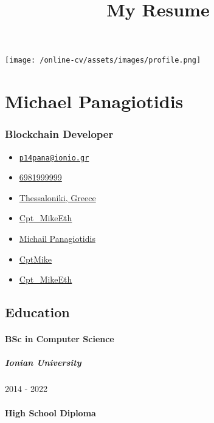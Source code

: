 \documentclass[english,]{article}
\title{My Resume}
\date{}
\providecommand{\tightlist}{%
  \setlength{\itemsep}{0pt}\setlength{\parskip}{0pt}}
\let\oldparagraph\paragraph
\renewcommand{\paragraph}[1]{\oldparagraph{#1}\mbox{}}
\let\oldsubparagraph\subparagraph
\renewcommand{\subparagraph}[1]{\oldsubparagraph{#1}\mbox{}}
\begin{document}
\maketitle

\texttt{[image: /online-cv/assets/images/profile.png]}

\hypertarget{michael-panagiotidis}{%
\section{Michael Panagiotidis}\label{michael-panagiotidis}}

\hypertarget{blockchain-developer}{%
\subsubsection{Blockchain Developer}\label{blockchain-developer}}

\begin{itemize}
\tightlist
\item
  \emph{} \href{mailto:p14pana@ionio.gr}{\nolinkurl{p14pana@ionio.gr}}
\item
  \emph{} \href{tel:6981999999}{6981999999}
\item
  \emph{} \href{}{Thessaloniki, Greece}
\item
  \emph{} \href{https://t.me/Cpt_MikeEth}{Cpt\_MikeEth}
\item
  \emph{} \href{https://linkedin.com/in/Michail\%20Panagiotidis}{Michail
  Panagiotidis}
\item
  \emph{} \href{http://github.com/CptMike}{CptMike}
\item
  \emph{} \href{https://twitter.com/Cpt_MikeEth}{Cpt\_MikeEth}
\end{itemize}

\hypertarget{education}{%
\subsection{Education}\label{education}}

\hypertarget{bsc-in-computer-science}{%
\paragraph{BSc in Computer Science}\label{bsc-in-computer-science}}

\hypertarget{ionian-university}{%
\subparagraph{Ionian University}\label{ionian-university}}

2014 - 2022

\hypertarget{high-school-diploma}{%
\paragraph{High School Diploma}\label{high-school-diploma}}
\end{document}
